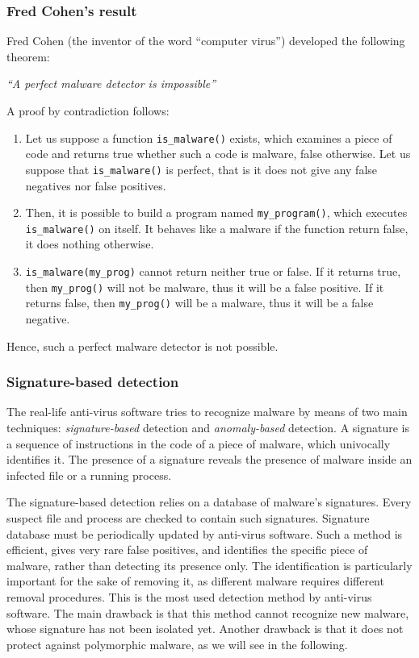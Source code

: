 \documentclass[a4paper,12pt]{article}
\begin{document}
\subsubsection{Fred Cohen's result}
Fred Cohen (the inventor of the word “computer virus”) developed the following theorem:
\begin{center}
\textit{“A perfect malware detector is impossible”}
\end{center}
A proof by contradiction follows:
\begin{enumerate}
	\item Let us suppose a function \texttt{is\_malware()} exists, which examines a piece of code and returns true whether such a code is malware, false otherwise. Let us suppose that \texttt{is\_malware()} is perfect, that is it does not give any false negatives nor false positives. 
	\item Then, it is possible to build a program named \texttt{my\_program()}, which executes \texttt{is\_malware()} on itself. It behaves like a malware if the function return false, it does nothing otherwise.
	\item \texttt{is\_malware(my\_prog)} cannot return neither true or false. If it returns true, then \texttt{my\_prog()} will not be malware, thus it will be a false positive. If it returns false, then \texttt{my\_prog()} will be a malware, thus it will be a false negative.
\end{enumerate}
Hence, such a perfect malware detector is not possible.

\subsubsection{Signature-based detection}
The real-life anti-virus software tries to recognize malware by means of two main techniques: \textit{signature-based} detection and \textit{anomaly-based} detection.
A signature is a sequence of instructions in the code of a piece of malware, which univocally identifies it. The presence of a signature reveals the presence of malware inside an infected file or a running process.

The signature-based detection relies on a database of malware's signatures. Every suspect file and process are checked to contain such signatures. Signature database must be periodically updated by anti-virus software.
Such a method is efficient, gives very rare false positives, and identifies the specific piece of malware, rather than detecting its presence only. The identification is particularly important for the sake of removing it, as different malware requires different removal procedures. This is the most used detection method by anti-virus software.
The main drawback is that this method cannot recognize new malware, whose signature has not been isolated yet. Another drawback is that it does not protect against polymorphic malware, as we will see in the following.
\end{document}
